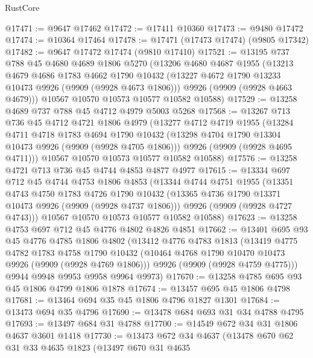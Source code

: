 \begin{lexlean}{RustCore}
\begin{coremodule}
@17471 := @9647 @17462
@17472 := @17411 @10360
@17473 := @9480 @17472
@17474 := @10364 @17464
@17478 := @17471 (@17473 @17474) (@9805 @17342)
@17482 := @9647 @17472 @17474 (@9810 @17410)
@17521 := @13195
    @737
    @788
    @45
    @4680
    @4689
    @1806
    @5270
    (@13206
      @4680
      @4687
      @1955
      (@13213
        @4679
        @4686
        @1783
        @4662
        @1790
        @10432
        (@13227 @4672 @1790 @13233 @10473 @9926 (@9909 (@9928 @4673 @1806)))
        @9926
        (@9909 (@9928 @4663 @4679)))
      @10567
      @10570
      @10573
      @10577
      @10582
      @10588)
@17529 := @13258 @4689 @737 @788 @45 @4712 @4979 @5003 @5268
@17568 := @13267
    @713
    @736
    @45
    @4712
    @4721
    @1806
    @4979
    (@13277
      @4712
      @4719
      @1955
      (@13284
        @4711
        @4718
        @1783
        @4694
        @1790
        @10432
        (@13298 @4704 @1790 @13304 @10473 @9926 (@9909 (@9928 @4705 @1806)))
        @9926
        (@9909 (@9928 @4695 @4711)))
      @10567
      @10570
      @10573
      @10577
      @10582
      @10588)
@17576 := @13258 @4721 @713 @736 @45 @4744 @4853 @4877 @4977
@17615 := @13334
    @697
    @712
    @45
    @4744
    @4753
    @1806
    @4853
    (@13344
      @4744
      @4751
      @1955
      (@13351
        @4743
        @4750
        @1783
        @4726
        @1790
        @10432
        (@13365 @4736 @1790 @13371 @10473 @9926 (@9909 (@9928 @4737 @1806)))
        @9926
        (@9909 (@9928 @4727 @4743)))
      @10567
      @10570
      @10573
      @10577
      @10582
      @10588)
@17623 := @13258 @4753 @697 @712 @45 @4776 @4802 @4826 @4851
@17662 := @13401
    @695
    @93
    @45
    @4776
    @4785
    @1806
    @4802
    (@13412
      @4776
      @4783
      @1813
      (@13419
        @4775
        @4782
        @1783
        @4758
        @1790
        @10432
        (@10464 @4768 @1790 @10470 @10473 @9926 (@9909 (@9928 @4769 @1806)))
        @9926
        (@9909 (@9928 @4759 @4775)))
      @9944
      @9948
      @9953
      @9958
      @9964
      @9973)
@17670 := @13258 @4785 @695 @93 @45 @1806 @4799 @1806 @1878
@17674 := @13457 @695 @45 @1806 @4798
@17681 := @13464 @694 @35 @45 @1806 @4796 @1827 @1301
@17684 := @13473 @694 @35 @4796
@17690 := @13478 @684 @693 @31 @34 @4788 @4795
@17693 := @13497 @684 @31 @4788
@17700 := @14549 @672 @34 @31 @1806 @4637 @3601 @1418
@17730 := @13473
    @672
    @34
    @4637
    (@13478
      @670
      @62
      @31
      @33
      @4635
      @1823
      (@13497
        @670
        @31
        @4635

\end{coremodule}
\end{lexlean}
